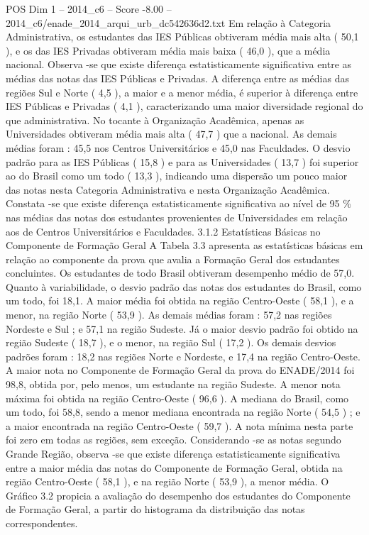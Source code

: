 \begin{textsample}{POS Dim 1 – 2014\_c6 – Score -8.00 – 2014\_c6/enade\_2014\_arqui\_urb\_dc542636d2.txt}
Em relação à Categoria Administrativa, os estudantes das IES Públicas obtiveram média mais alta ( 50,1 ), e os das IES Privadas obtiveram média mais baixa ( 46,0 ), que a média nacional.
Observa -se que existe diferença estatisticamente significativa entre as médias das notas das IES Públicas e Privadas.
A diferença entre as médias das regiões Sul e Norte ( 4,5 ), a maior e a menor média, é superior à diferença entre IES Públicas e Privadas ( 4,1 ), caracterizando uma maior diversidade regional do que administrativa.
No tocante à Organização Acadêmica, apenas as Universidades obtiveram média mais alta ( 47,7 ) que a nacional.
As demais médias foram : 45,5 nos Centros Universitários e 45,0 nas Faculdades.
O desvio padrão para as IES Públicas ( 15,8 ) e para as Universidades ( 13,7 ) foi superior ao do Brasil como um todo ( 13,3 ), indicando uma dispersão um pouco maior das notas nesta Categoria Administrativa e nesta Organização Acadêmica.
Constata -se que existe diferença estatisticamente significativa ao nível de 95 \% nas médias das notas dos estudantes provenientes de Universidades em relação aos de Centros Universitários e Faculdades. 3.1.2 Estatísticas Básicas no Componente de Formação Geral A Tabela 3.3 apresenta as estatísticas básicas em relação ao componente da prova que avalia a Formação Geral dos estudantes concluintes.
Os estudantes de todo Brasil obtiveram desempenho médio de 57,0.
Quanto à variabilidade, o desvio padrão das notas dos estudantes do Brasil, como um todo, foi 18,1.
A maior média foi obtida na região Centro-Oeste ( 58,1 ), e a menor, na região Norte ( 53,9 ).
As demais médias foram : 57,2 nas regiões Nordeste e Sul ; e 57,1 na região Sudeste.
Já o maior desvio padrão foi obtido na região Sudeste ( 18,7 ), e o menor, na região Sul ( 17,2 ).
Os demais desvios padrões foram : 18,2 nas regiões Norte e Nordeste, e 17,4 na região Centro-Oeste.
A maior nota no Componente de Formação Geral da prova do ENADE/2014 foi 98,8, obtida por, pelo menos, um estudante na região Sudeste.
A menor nota máxima foi obtida na região Centro-Oeste ( 96,6 ).
A mediana do Brasil, como um todo, foi 58,8, sendo a menor mediana encontrada na região Norte ( 54,5 ) ; e a maior encontrada na região Centro-Oeste ( 59,7 ).
A nota mínima nesta parte foi zero em todas as regiões, sem exceção.
Considerando -se as notas segundo Grande Região, observa -se que existe diferença estatisticamente significativa entre a maior média das notas do Componente de Formação Geral, obtida na região Centro-Oeste ( 58,1 ), e na região Norte ( 53,9 ), a menor média.
O Gráfico 3.2 propicia a avaliação do desempenho dos estudantes do Componente de Formação Geral, a partir do histograma da distribuição das notas correspondentes.

\end{textsample}

